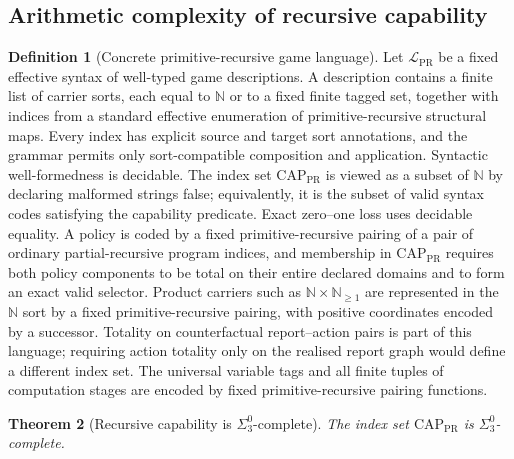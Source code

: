 \documentclass[11pt]{article}
\theoremstyle{plain}
\newtheorem{theorem}{Theorem}[section]
\theoremstyle{definition}
\newtheorem{definition}[theorem]{Definition}
\theoremstyle{remark}
\newcommand{\N}{\mathbb{N}}
\begin{document}
\subsection{Arithmetic complexity of recursive capability}

\begin{definition}[Concrete primitive-recursive game language]\label{def:AHdef}
Let $\mathcal L_{\mathrm{PR}}$ be a fixed effective syntax of well-typed game
descriptions. A description contains a finite list of carrier sorts, each equal
to $\N$ or to a fixed finite tagged set, together with indices from a standard
effective enumeration of primitive-recursive structural maps. Every index has
explicit source and target sort annotations, and the grammar permits only
sort-compatible composition and application. Syntactic well-formedness is
decidable. The index set $\mathrm{CAP}_{\mathrm{PR}}$ is viewed as a subset of
$\N$ by declaring malformed strings false; equivalently, it is the subset of
valid syntax codes satisfying the capability predicate. Exact zero--one loss uses
decidable equality. A policy is coded by a fixed primitive-recursive pairing of a
pair of ordinary partial-recursive program indices, and membership in
$\mathrm{CAP}_{\mathrm{PR}}$ requires both policy components to be total on their
entire declared domains and to form an exact valid selector. Product carriers
such as $\N\times\N_{\ge1}$ are represented in the $\N$ sort by a fixed
primitive-recursive pairing, with positive coordinates encoded by a successor.
Totality on counterfactual report--action pairs is part of this language;
requiring action totality only on the realised report graph would define a
different index set. The universal variable tags and all finite tuples of
computation stages are encoded by fixed primitive-recursive pairing functions.
\end{definition}

\begin{theorem}[Recursive capability is $\Sigma^0_3$-complete]\label{thm:AH}
The index set $\mathrm{CAP}_{\mathrm{PR}}$ is $\Sigma^0_3$-complete.
\end{theorem}
\end{document}
